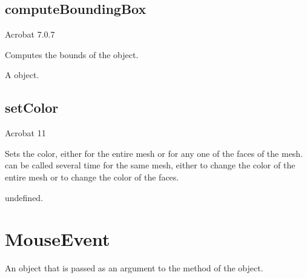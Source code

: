 \documentclass[letterpaper,12pt,english,openany,oneside]{sphinxmanual}
\begin{document}
\label{\detokenize{JS_3D_API:properties-17}}


\subsection{computeBoundingBox}
\label{\detokenize{JS_3D_API:computeboundingbox}}
Acrobat 7.0.7

Computes the bounds of the  object.

\label{\detokenize{JS_3D_API:syntax-67}}

\begin{sphinxVerbatim}[commandchars=\\\{\}]
\end{sphinxVerbatim}
\label{\detokenize{JS_3D_API:returns-68}}

A  object.


\subsection{setColor}
\label{\detokenize{JS_3D_API:setcolor-1}}\label{\detokenize{JS_3D_API:id18}}
Acrobat 11

Sets the color, either for the entire mesh or for any one of the faces of the mesh.  can be called several time for the same mesh, either to change the color of the entire mesh or to change the color of the faces.

\label{\detokenize{JS_3D_API:syntax-68}}

\begin{sphinxVerbatim}[commandchars=\\\{\}]
\end{sphinxVerbatim}
\label{\detokenize{JS_3D_API:parameters-51}}

\label{\detokenize{JS_3D_API:section-72}}\label{\detokenize{JS_3D_API:returns-69}}

undefined.


\section{MouseEvent}
\label{\detokenize{JS_3D_API:mouseevent}}
An object that is passed as an argument to the  method of the  object.
\end{document}
